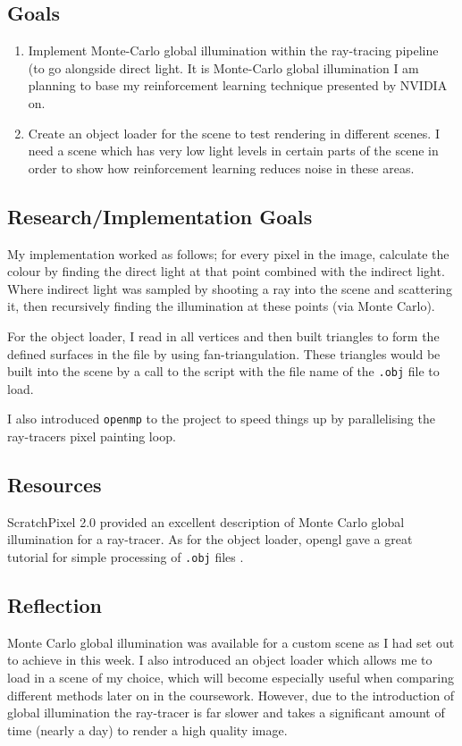 \documentclass[conference]{IEEEtran}
\begin{document}
\subsection{Goals}
\begin{enumerate}
\item Implement Monte-Carlo global illumination within the ray-tracing pipeline (to go alongside direct light. It is Monte-Carlo global illumination I am planning to base my reinforcement learning technique presented by NVIDIA \cite{dahm2017learning} on.

\item Create an object loader for the scene to test rendering in different scenes. I need a scene which has very low light levels in certain parts of the scene in order to show how reinforcement learning reduces noise in these areas.
\end{enumerate}

\subsection{Research/Implementation Goals}
My implementation worked as follows; for every pixel in the image, calculate the colour by finding the direct light at that point combined with the indirect light. Where indirect light was sampled by shooting a ray into the scene and scattering it, then recursively finding the illumination at these points (via Monte Carlo).

For the object loader, I read in all vertices and then built triangles to form the defined surfaces in the file by using fan-triangulation. These triangles would be built into the scene by a call to the script with the file name of the \verb|.obj| file to load.

I also introduced \verb|openmp| to the project to speed things up by parallelising the ray-tracers pixel painting loop. 

\subsection{Resources}
ScratchPixel 2.0 \cite{scratch-pixel} provided an excellent description of Monte Carlo global illumination for a ray-tracer. As for the object loader, opengl gave a great tutorial for simple processing of \verb|.obj| files \cite{opengl-obj}. 

\subsection{Reflection}
Monte Carlo global illumination was available for a custom scene as I had set out to achieve in this week. I also introduced an object loader which allows me to load in a scene of my choice, which will become especially useful when comparing different methods later on in the coursework. However, due to the introduction of global illumination the ray-tracer is far slower and takes a significant amount of time (nearly a day) to render a high quality image.
\end{document}
